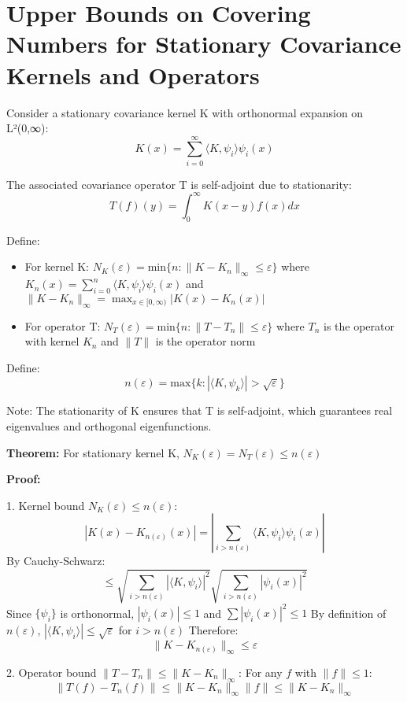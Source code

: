 \documentclass{article}
\begin{document}
\section*{Upper Bounds on Covering Numbers for Stationary Covariance Kernels and Operators}

Consider a stationary covariance kernel K with orthonormal expansion on L²(0,∞):
\[K(x) = \sum_{i=0}^{\infty} \langle K,\psi_i \rangle \psi_i(x)\]

The associated covariance operator T is self-adjoint due to stationarity:
\[T(f)(y) = \int_0^{\infty} K(x-y)f(x)dx\]

Define:
\begin{itemize}
\item For kernel K:
   $N_K(\varepsilon) = \text{min}\{n : \|K - K_n\|_{\infty} \leq \varepsilon\}$
   where $K_n(x) = \sum_{i=0}^n \langle K,\psi_i \rangle \psi_i(x)$
   and $\|K - K_n\|_{\infty} = \max_{x \in [0,\infty)} |K(x) - K_n(x)|$

\item For operator T:
   $N_T(\varepsilon) = \text{min}\{n : \|T - T_n\| \leq \varepsilon\}$
   where $T_n$ is the operator with kernel $K_n$
   and $\|T\|$ is the operator norm
\end{itemize}

Define:
\[n(\varepsilon) = \text{max}\{k : |\langle K,\psi_k \rangle| > \sqrt{\varepsilon}\}\]

Note: The stationarity of K ensures that T is self-adjoint, which guarantees real eigenvalues and orthogonal eigenfunctions.

\textbf{Theorem:} For stationary kernel K, $N_K(\varepsilon) = N_T(\varepsilon) \leq n(\varepsilon)$

\textbf{Proof:}

1. Kernel bound $N_K(\varepsilon) \leq n(\varepsilon)$:
   \[|K(x) - K_{n(\varepsilon)}(x)| = |\sum_{i>n(\varepsilon)} \langle K,\psi_i \rangle \psi_i(x)|\]
   By Cauchy-Schwarz:
   \[\leq \sqrt{\sum_{i>n(\varepsilon)} |\langle K,\psi_i \rangle|^2} \sqrt{\sum_{i>n(\varepsilon)} |\psi_i(x)|^2}\]
   Since $\{\psi_i\}$ is orthonormal, $|\psi_i(x)| \leq 1$ and $\sum |\psi_i(x)|^2 \leq 1$
   By definition of $n(\varepsilon)$, $|\langle K,\psi_i \rangle| \leq \sqrt{\varepsilon}$ for $i > n(\varepsilon)$
   Therefore:
   \[\|K - K_{n(\varepsilon)}\|_{\infty} \leq \varepsilon\]

2. Operator bound $\|T - T_n\| \leq \|K - K_n\|_{\infty}$:
   For any $f$ with $\|f\| \leq 1$:
   \[\|T(f) - T_n(f)\| \leq \|K - K_n\|_{\infty} \|f\| \leq \|K - K_n\|_{\infty}\]
\end{document}
